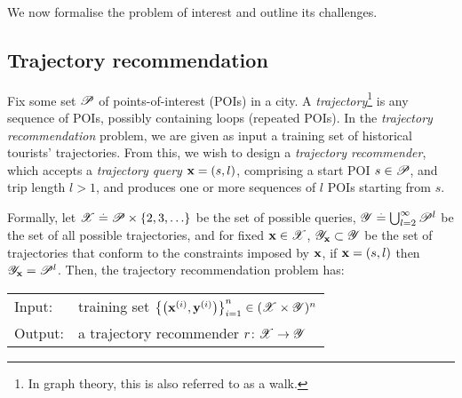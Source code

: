 
We now formalise the problem of interest and outline its challenges.

%
\subsection{Trajectory recommendation}

Fix some set $\mathscr{P}$ of points-of-interest (POIs) in a city.
A \emph{trajectory}\footnote{In graph theory, this is also referred to as a walk.} is any sequence of POIs, possibly containing loops (repeated POIs).
In the \emph{trajectory recommendation} problem, we are given as input a training set of historical tourists' trajectories.
From this, we wish to design a \emph{trajectory recommender}, which accepts a
\emph{trajectory query} $\mathbf{x} = (s, l)$, comprising a start POI $s \in \mathscr{P}$, and trip length $l \!>\! 1$, %
and produces one or more sequences of $l$ POIs starting from $s$. %

Formally, let $\mathscr{X} \stackrel{.}{=} \mathscr{P} \times \{ 2, 3, \ldots \}$ be the set of possible queries,
$\mathscr{Y} \stackrel{.}{=} \bigcup_{l = 2}^\infty \mathscr{P}^l$ be the set of all possible trajectories,
and for fixed $\mathbf{x} \in \mathscr{X}$, $\mathscr{Y}_{\mathbf{x}} \subset \mathscr{Y}$ be the set of trajectories that conform to the constraints imposed by $\mathbf{x}$,
\ie if $\mathbf{x} = (s, l)$ then $\mathscr{Y}_{\mathbf{x}} = \mathscr{P}^l$.
Then, the {trajectory recommendation} problem has:

\vspace{0.5\baselineskip}

\begin{mdframed}[innertopmargin=3pt,innerbottommargin=3pt,skipbelow=5pt,roundcorner=8pt,backgroundcolor=red!3,topline=false,rightline=false,leftline=false,bottomline=false]
	\begin{tabular}{ll}
		{\sc Input}:  & training set $\left\{ \left( \mathbf{x}^{(i)}, \mathbf{y}^{(i)} \right) \right\}_{i = 1}^n \in ( \mathscr{X} \times \mathscr{Y} )^n$ \\
		{\sc Output}: & a trajectory recommender $r \colon \mathscr{X} \to \mathscr{Y}$ \\
	\end{tabular}
\end{mdframed}

\vspace{0.5\baselineskip}

